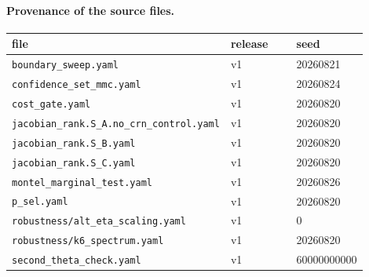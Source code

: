 \paragraph{Provenance of the source files.}
\begin{longtable}{p{0.45\linewidth} p{0.25\linewidth} p{0.20\linewidth}}
\toprule
file & release & seed \\
\midrule
\endhead
\texttt{\footnotesize boundary\_sweep.yaml} & v1 & 20260821 \\
\texttt{\footnotesize confidence\_set\_mmc.yaml} & v1 & 20260824 \\
\texttt{\footnotesize cost\_gate.yaml} & v1 & 20260820 \\
\texttt{\footnotesize jacobian\_rank.S\_A.no\_crn\_control.yaml} & v1 & 20260820 \\
\texttt{\footnotesize jacobian\_rank.S\_B.yaml} & v1 & 20260820 \\
\texttt{\footnotesize jacobian\_rank.S\_C.yaml} & v1 & 20260820 \\
\texttt{\footnotesize montel\_marginal\_test.yaml} & v1 & 20260826 \\
\texttt{\footnotesize p\_sel.yaml} & v1 & 20260820 \\
\texttt{\footnotesize robustness/alt\_eta\_scaling.yaml} & v1 & 0 \\
\texttt{\footnotesize robustness/k6\_spectrum.yaml} & v1 & 20260820 \\
\texttt{\footnotesize second\_theta\_check.yaml} & v1 & 60000000000 \\
\bottomrule
\end{longtable}

